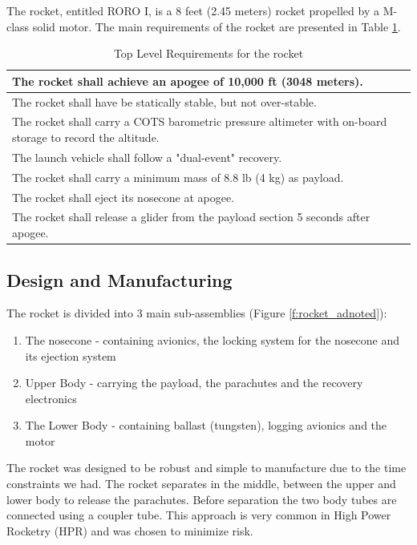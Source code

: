 
The rocket, entitled RORO I, is a 8 feet (2.45 meters) rocket propelled by a M-class solid motor. The main requirements of the rocket are presented in Table \ref{table:se_topLevelR}.

\begin{table}[h!]
\centering
\begin{tabular}{|p{}|}
\hline
    The rocket shall achieve an apogee of 10,000 ft (3048 meters).  \\ \hline
    The rocket shall have be statically stable, but not over-stable. \\ \hline
    The rocket shall carry a COTS barometric pressure altimeter with on-board storage to record the altitude.  \\ \hline
    The launch vehicle shall follow a "dual-event" recovery. \\ \hline
    The rocket shall carry a minimum mass of 8.8 lb (4 kg) as payload. \\ \hline
    The rocket shall eject its nosecone at apogee. \\ \hline
    The rocket shall release a glider from the payload section 5 seconds after apogee. \\ \hline

\end{tabular}
\caption{Top Level Requirements for the rocket}
\label{table:se_topLevelR}
\end{table}


\subsection{Design and Manufacturing}


The rocket is divided into 3 main sub-assemblies (Figure \ref{f:rocket_adnoted}):
\begin{enumerate}[noitemsep]
    \item The nosecone - containing avionics, the locking system for the nosecone and its ejection system
    \item Upper Body - carrying the payload, the parachutes and the recovery electronics
    \item The Lower Body - containing ballast (tungsten), logging avionics and the motor
\end{enumerate}
The rocket was designed to be robust and simple to manufacture due to the time constraints we had.
The rocket separates in the middle, between the upper and lower body to release the parachutes. Before separation the two body tubes are connected using a coupler tube.
This approach is very common in High Power Rocketry (HPR) and was chosen to minimize risk.

